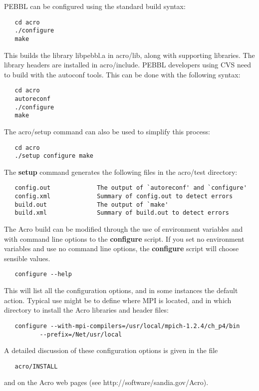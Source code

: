 PEBBL can be configured using the standard build syntax:
\begin{verbatim}
   cd acro
   ./configure
   make
\end{verbatim}
This builds the library libpebbl.a in acro/lib, along with supporting
libraries. The library headers are installed in acro/include.
PEBBL developers using CVS need to build with the autoconf tools.  This can be
done with the following syntax:
\begin{verbatim}
   cd acro
   autoreconf
   ./configure
   make
\end{verbatim}
The acro/setup command can also be used to simplify this process:
\begin{verbatim}
   cd acro
   ./setup configure make
\end{verbatim}
The {\bf setup} command generates the following files in the acro/test
directory:
\begin{verbatim}
   config.out             The output of `autoreconf' and `configure'
   config.xml             Summary of config.out to detect errors
   build.out              The output of `make'
   build.xml              Summary of build.out to detect errors
\end{verbatim}

The Acro build can be modified through the use of environment variables
and with command line options to the {\bf configure} script.  If you set no
environment variables and use no command line options, the {\bf configure}
script will choose sensible values.
\begin{verbatim}
   configure --help
\end{verbatim}
This will list all the configuration options, and in some instances the
default action.  Typical use might be to define where MPI is located,
and in which directory to install the Acro libraries and header files:
\begin{verbatim}
   configure --with-mpi-compilers=/usr/local/mpich-1.2.4/ch_p4/bin
          --prefix=/Net/usr/local
\end{verbatim}
A detailed discussion of these configuration options is given in the file
\begin{verbatim}
   acro/INSTALL
\end{verbatim}
and on the Acro web pages (see http://software/sandia.gov/Acro).
